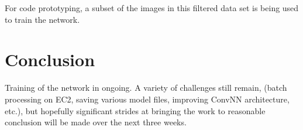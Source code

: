 \documentclass[letterpaper,12pt]{article}
\begin{document}
For code prototyping, a subset of the images in this filtered data set is being used to train the network.

\section{Conclusion}

Training of the network in ongoing. A variety of challenges still remain, (batch processing on EC2, saving various model files, improving ConvNN architecture, etc.), but hopefully significant strides at bringing the work to reasonable conclusion will be made over the next three weeks. 



\end{document}

